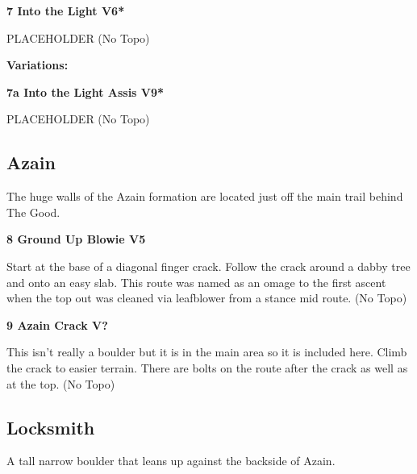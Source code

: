 \begin{multicols}{2}
					\label{rt:Into the Light}
\colorbox{RoyalBlue!20}{
\parbox{0.95\linewidth}{
\textbf{
7 Into the Light V6*  
}
}
}

					\begin{adjustwidth}{0.5cm}{}				
					PLACEHOLDER
						\newline (No Topo) 
					\end{adjustwidth}
						\begin{adjustwidth}{0.5cm}{}				
						\textbf{Variations:} \newline
							\label{vr:Into the Light Assis}
\colorbox{Goldenrod!50}{
\parbox{0.95\linewidth}{
\textbf{
7a Into the Light Assis V9*  
}
}
}

							\begin{adjustwidth}{0.5cm}{}				
							PLACEHOLDER
								\newline (No Topo) 
							\end{adjustwidth}
						\end{adjustwidth}
			\subsection*{Azain}\label{bf:Azain}
			The huge walls of the Azain formation are located just off the main trail behind The Good.\\
			
					\label{rt:Ground Up Blowie}
\colorbox{RoyalBlue!20}{
\parbox{0.95\linewidth}{
\textbf{
8 Ground Up Blowie V5    
}
}
}

					\begin{adjustwidth}{0.5cm}{}				
					Start at the base of a diagonal finger crack. Follow the crack around a dabby tree and onto an easy slab. This route was named as an omage to the first ascent when the top out was cleaned via leafblower from a stance mid route.
						\newline (No Topo) 
					\end{adjustwidth}
					\label{rt:Azain Crack}
\colorbox{black!20}{
\parbox{0.95\linewidth}{
\textbf{
9 Azain Crack V?  
}
}
}

					\begin{adjustwidth}{0.5cm}{}				
					This isn't really a boulder but it is in the main area so it is included here. Climb the crack to easier terrain. There are bolts on the route after the crack as well as at the top.
						\newline (No Topo) 
					\end{adjustwidth}
			\subsection*{Locksmith}\label{bf:Locksmith}
			A tall narrow boulder that leans up against the backside of Azain.\\
			

\end{multicols}
